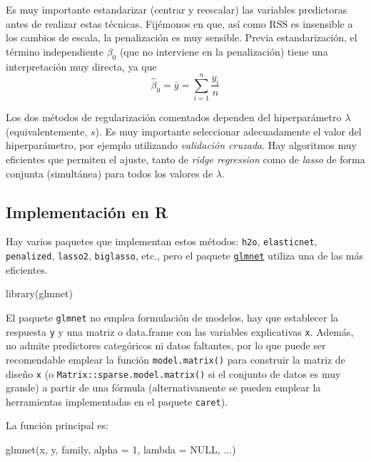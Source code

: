 \documentclass[
  spanish,
]{book}
\newenvironment{Shaded}{\begin{snugshade}}{\end{snugshade}}
\newcommand{\AttributeTok}[1]{\textcolor[rgb]{0.77,0.63,0.00}{#1}}
\newcommand{\ConstantTok}[1]{\textcolor[rgb]{0.00,0.00,0.00}{#1}}
\newcommand{\DecValTok}[1]{\textcolor[rgb]{0.00,0.00,0.81}{#1}}
\newcommand{\FunctionTok}[1]{\textcolor[rgb]{0.00,0.00,0.00}{#1}}
\newcommand{\NormalTok}[1]{#1}
\theoremstyle{break}
\theoremstyle{definition}
\theoremstyle{definition}
\theoremstyle{definition}
\theoremstyle{definition}
\theoremstyle{remark}
\begin{document}
Es muy importante estandarizar (centrar y reescalar) las variables predictoras antes de realizar estas técnicas.
Fijémonos en que, así como \(\mbox{RSS}\) es insensible a los cambios de escala, la penalización es muy sensible.
Previa estandarización, el término independiente \(\beta_0\) (que no interviene en la penalización) tiene una interpretación muy directa, ya que
\[\widehat \beta_0 = \bar y =\sum_{i=1}^n \frac{y_i}{n}\]

Los dos métodos de regularización comentados dependen del hiperparámetro \(\lambda\) (equivalentemente, \(s\)).
Es muy importante seleccionar adecuadamente el valor del hiperparámetro, por ejemplo utilizando \emph{validación cruzada}.
Hay algoritmos muy eficientes que permiten el ajuste, tanto de \emph{ridge regression} como de \emph{lasso} de forma conjunta (simultánea) para todos los valores de \(\lambda\).

\hypertarget{implementaciuxf3n-en-r}{%
\subsection{Implementación en R}\label{implementaciuxf3n-en-r}}

Hay varios paquetes que implementan estos métodos: \texttt{h2o}, \texttt{elasticnet}, \texttt{penalized}, \texttt{lasso2}, \texttt{biglasso}, etc., pero el paquete \href{https://glmnet.stanford.edu}{\texttt{glmnet}} utiliza una de las más eficientes.

\begin{Shaded}
\begin{Highlighting}[]
\FunctionTok{library}\NormalTok{(glmnet)}
\end{Highlighting}
\end{Shaded}

El paquete \texttt{glmnet} no emplea formulación de modelos, hay que establecer la respuesta
\texttt{y} y una matriz o data.frame con las variables explicativas \texttt{x}.
Además, no admite predictores categóricos ni datos faltantes, por lo que puede ser recomendable emplear la función \texttt{model.matrix()} para construir la matriz de diseño \texttt{x} (o \texttt{Matrix::sparse.model.matrix()} si el conjunto de datos es muy grande) a partir de una fórmula (alternativamente se pueden emplear la herramientas implementadas en el paquete \texttt{caret}).

La función principal es:

\begin{Shaded}
\begin{Highlighting}[]
\FunctionTok{glmnet}\NormalTok{(x, y, family, }\AttributeTok{alpha =} \DecValTok{1}\NormalTok{, }\AttributeTok{lambda =} \ConstantTok{NULL}\NormalTok{, ...)}
\end{Highlighting}
\end{Shaded}
\end{document}
